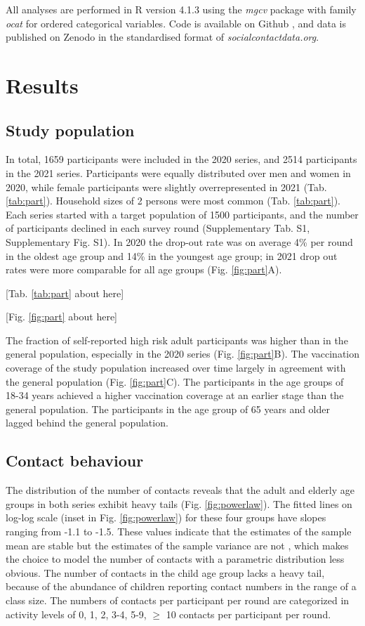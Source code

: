 \documentclass[fleqn,10pt]{wlscirep}
\begin{document}
All analyses are performed in R version 4.1.3 \cite{R_2022} using the \textit{mgcv} package \cite{Wood_2017} with family \textit{ocat} for ordered categorical variables. Code is available on Github \cite{Github_RIVM}, and data is published on Zenodo \cite{Zenodo_2022} in the standardised format of \textit{socialcontactdata.org}.

\section*{Results}

\subsection*{Study population}

In total, 1659 participants were included in the 2020 series, and 2514 participants in the 2021 series. Participants were equally distributed over men and women in 2020, while female participants were slightly overrepresented in 2021 (Tab. \ref{tab:part}). Household sizes of 2 persons were most common (Tab. \ref{tab:part}). Each series started with a target population of 1500 participants, and the number of participants declined in each survey round (Supplementary Tab. S1, Supplementary Fig. S1). In 2020 the drop-out rate was on average 4\% per round in the oldest age group and 14\% in the youngest age group; in 2021 drop out rates were more comparable for all age groups (Fig. \ref{fig:part}A).

[Tab. \ref{tab:part} about here]

[Fig. \ref{fig:part} about here]

The fraction of self-reported high risk adult participants was higher than in the general population, especially in the 2020 series (Fig. \ref{fig:part}B). The vaccination coverage of the study population increased over time largely in agreement with the general population (Fig. \ref{fig:part}C). The participants in the age groups of 18-34 years achieved a higher vaccination coverage at an earlier stage than the general population. The participants in the age group of 65 years and older lagged behind the general population.

\subsection*{Contact behaviour}

The distribution of the number of contacts reveals that the adult and elderly age groups in both series exhibit heavy tails (Fig. \ref{fig:powerlaw}). The fitted lines on log-log scale (inset in Fig. \ref{fig:powerlaw}) for these four groups have slopes ranging from -1.1 to -1.5. These values indicate that the estimates of the sample mean are stable but the estimates of the sample variance are not \cite{Tagore_2015}, which makes the choice to model the number of contacts with a parametric distribution less obvious. The number of contacts in the child age group lacks a heavy tail, because of the abundance of children reporting contact numbers in the range of a class size. The numbers of contacts per participant per round are categorized in activity levels of 0, 1, 2, 3-4, 5-9, $\geq$ 10 contacts per participant per round.
\end{document}
